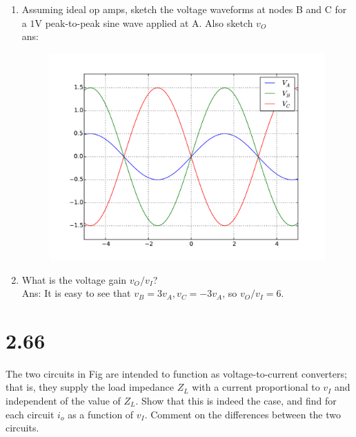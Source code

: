 \documentclass[12pt, a4paper]{article}
\newcommand{\svol}{\si{\volt}}
\begin{document}
\begin{enumerate}[label=(\alph*)]
  \item Assuming ideal op amps, sketch the voltage waveforms at nodes B and C for a $1\svol$ peak-to-peak sine wave applied at A. Also sketch $v_O$\\
  ans: 
  \begin{figure}[H]
    \centering
    \includegraphics[width=.6\textwidth]{2_66.pdf}
  \end{figure}
  \item What is the voltage gain $v_O / v_I$? \\
    Ans: It is easy to see that $v_B = 3 v_A, v_C = -3 v_A$, so $v_O / v_I = 6$.
\end{enumerate}

\section{2.66}
The two circuits in Fig are intended to function as voltage-to-current converters; that is, they supply the load impedance $Z_L$ with a current proportional to $v_I$ and independent of the value of $Z_L$. Show that this is indeed the case, and find for each circuit $i_o$ as a function of $v_I$. Comment on the differences between the two circuits.
\end{document}
